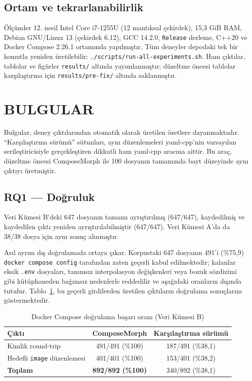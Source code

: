\documentclass[12pt,a4paper]{article}
\begin{document}
\subsection{Ortam ve tekrarlanabilirlik}
Ölçümler 12. nesil Intel Core i7-1255U (12 mantıksal çekirdek), 15,3 GiB
RAM, Debian GNU/Linux 13 (çekirdek 6.12), GCC 14.2.0, \texttt{Release}
derleme, C++20 ve Docker Compose 2.26.1 ortamında yapılmıştır. Tüm
deneyler depodaki tek bir komutla yeniden üretilebilir:
\texttt{./scripts/run-all-experiments.sh}. Ham çıktılar, tablolar ve
figürler \texttt{results/} altında yayımlanmıştır; düzeltme öncesi
tablolar karşılaştırma için \texttt{results/pre-fix/} altında saklanmıştır.

\section{BULGULAR}
\label{sec:bulgular}

Bulgular, deney çıktılarından otomatik olarak üretilen özetlere dayanmaktadır.
``Karşılaştırma sürümü'' sütunları, aynı düzenlemeleri yaml-cpp'nin varsayılan
serileştiricisiyle gerçekleştiren dikkatli ham yaml-cpp aracına aittir. Bu araç,
düzeltme öncesi ComposeMorph ile 100 dosyanın tamamında bayt düzeyinde aynı
çıktıyı üretmiştir.

\subsection{RQ1 --- Doğruluk}
Veri Kümesi B'deki 647 dosyanın tamamı ayrıştırılmış (647/647), kaydedilmiş
ve kaydedilen çıktı yeniden ayrıştırılabilmiştir (647/647). Veri Kümesi
A'da da 38/38 dosya için aynı sonuç alınmıştır.

Asıl ayrım dış doğrulamada ortaya çıkar. Korpustaki 647 dosyanın 491'i
(\%75,9) \texttt{docker compose config} tarafından zaten geçerli kabul
edilmektedir; kalanlar eksik \texttt{.env} dosyaları, tanımsız
interpolasyon değişkenleri veya bozuk sözdizimi gibi kütüphaneden bağımsız
nedenlerle reddedilir ve aşağıdaki oranların dışında tutulur.
Tablo~\ref{tab:validation}, bu geçerli girdilerden üretilen çıktıların
doğrulama sonuçlarını göstermektedir.

\begin{table}[t]
\caption{Docker Compose doğrulama başarı oranı (Veri Kümesi B)}
\label{tab:validation}
\centering
\begin{tabular}{lcc}
\toprule
Çıktı & ComposeMorph & Karşılaştırma sürümü \\
\midrule
Kimlik round-trip & 491/491 (\%100) & 187/491 (\%38,1) \\
Hedefli \texttt{image} düzenlemesi & 401/401 (\%100) & 153/401 (\%38,2) \\
\midrule
\textbf{Toplam} & \textbf{892/892 (\%100)} & 340/892 (\%38,1) \\
\bottomrule
\end{tabular}
\end{table}
\end{document}
